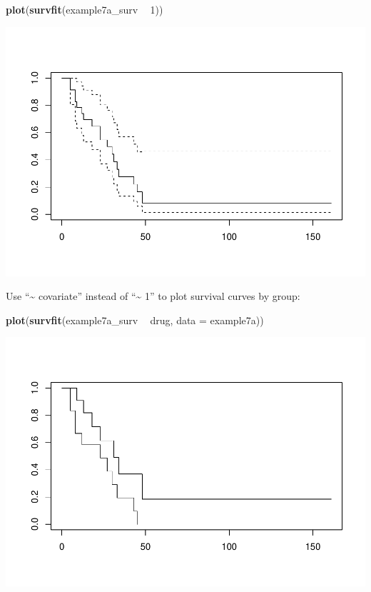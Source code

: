 \documentclass[]{book}
\newenvironment{Shaded}{\begin{snugshade}}{\end{snugshade}}
\newcommand{\DataTypeTok}[1]{\textcolor[rgb]{0.13,0.29,0.53}{#1}}
\newcommand{\DecValTok}[1]{\textcolor[rgb]{0.00,0.00,0.81}{#1}}
\newcommand{\KeywordTok}[1]{\textcolor[rgb]{0.13,0.29,0.53}{\textbf{#1}}}
\newcommand{\NormalTok}[1]{#1}
\newcommand{\OperatorTok}[1]{\textcolor[rgb]{0.81,0.36,0.00}{\textbf{#1}}}
\newcommand{\StringTok}[1]{\textcolor[rgb]{0.31,0.60,0.02}{#1}}
\begin{document}
\begin{Shaded}
\begin{Highlighting}[]
\KeywordTok{plot}\NormalTok{(}\KeywordTok{survfit}\NormalTok{(example7a_surv }\OperatorTok{~}\StringTok{ }\DecValTok{1}\NormalTok{))}
\end{Highlighting}
\end{Shaded}

\includegraphics{07-week7_files/figure-latex/week7d-1.pdf}

Use ``\textasciitilde{} covariate'' instead of ``\textasciitilde{} 1'' to plot survival curves by group:

\begin{Shaded}
\begin{Highlighting}[]
\KeywordTok{plot}\NormalTok{(}\KeywordTok{survfit}\NormalTok{(example7a_surv }\OperatorTok{~}\StringTok{ }\NormalTok{drug, }\DataTypeTok{data =}\NormalTok{ example7a))}
\end{Highlighting}
\end{Shaded}

\includegraphics{07-week7_files/figure-latex/week7e-1.pdf}
\end{document}
